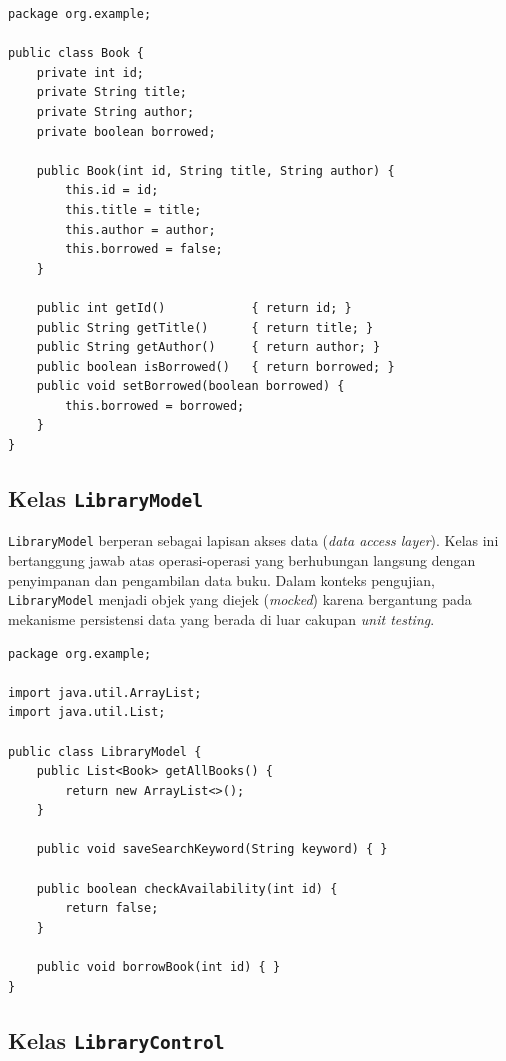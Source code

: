 \documentclass[12pt,a4paper]{article}
\begin{document}
\begin{lstlisting}[caption={Implementasi kelas \texttt{Book}},
                   label={lst:book}]
package org.example;

public class Book {
    private int id;
    private String title;
    private String author;
    private boolean borrowed;

    public Book(int id, String title, String author) {
        this.id = id;
        this.title = title;
        this.author = author;
        this.borrowed = false;
    }

    public int getId()            { return id; }
    public String getTitle()      { return title; }
    public String getAuthor()     { return author; }
    public boolean isBorrowed()   { return borrowed; }
    public void setBorrowed(boolean borrowed) {
        this.borrowed = borrowed;
    }
}
\end{lstlisting}

\subsection{Kelas \texttt{LibraryModel}}

\texttt{LibraryModel} berperan sebagai lapisan akses data (\textit{data access
layer}). Kelas ini bertanggung jawab atas operasi-operasi yang berhubungan
langsung dengan penyimpanan dan pengambilan data buku. Dalam konteks pengujian,
\texttt{LibraryModel} menjadi objek yang diejek (\textit{mocked}) karena
bergantung pada mekanisme persistensi data yang berada di luar cakupan
\textit{unit testing}.

\begin{lstlisting}[caption={Implementasi kelas \texttt{LibraryModel}},
                   label={lst:model}]
package org.example;

import java.util.ArrayList;
import java.util.List;

public class LibraryModel {
    public List<Book> getAllBooks() {
        return new ArrayList<>();
    }

    public void saveSearchKeyword(String keyword) { }

    public boolean checkAvailability(int id) {
        return false;
    }

    public void borrowBook(int id) { }
}
\end{lstlisting}

\subsection{Kelas \texttt{LibraryControl}}
\end{document}
